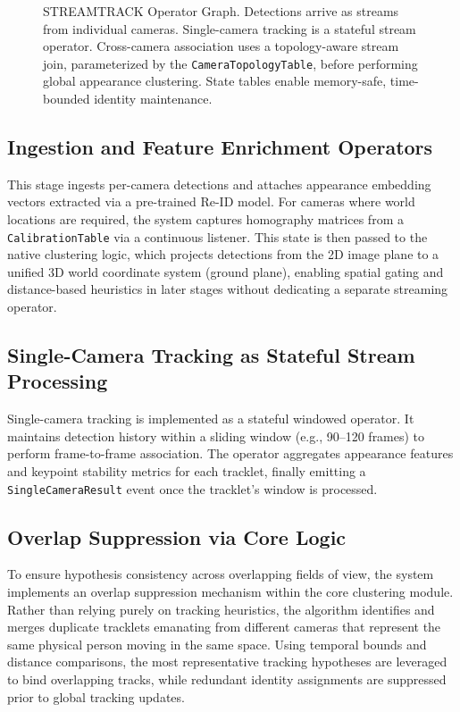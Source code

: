\documentclass[11pt]{article}
\begin{document}
\begin{figure}[H]
{
}
\caption{STREAMTRACK Operator Graph. Detections arrive as streams from individual cameras. Single-camera tracking is a stateful stream operator. Cross-camera association uses a topology-aware stream join, parameterized by the \texttt{CameraTopologyTable}, before performing global appearance clustering. State tables enable memory-safe, time-bounded identity maintenance.}
\label{fig:architecture}
\end{figure}

\subsection{Ingestion and Feature Enrichment Operators}
This stage ingests per-camera detections and attaches appearance embedding vectors extracted via a pre-trained Re-ID model. For cameras where world locations are required, the system captures homography matrices from a \texttt{CalibrationTable} via a continuous listener. This state is then passed to the native clustering logic, which projects detections from the 2D image plane to a unified 3D world coordinate system (ground plane), enabling spatial gating and distance-based heuristics in later stages without dedicating a separate streaming operator.

\subsection{Single-Camera Tracking as Stateful Stream Processing}
Single-camera tracking is implemented as a stateful windowed operator. It maintains detection history within a sliding window (e.g., 90--120 frames) to perform frame-to-frame association. The operator aggregates appearance features and keypoint stability metrics for each tracklet, finally emitting a \texttt{SingleCameraResult} event once the tracklet's window is processed.

\subsection{Overlap Suppression via Core Logic}
To ensure hypothesis consistency across overlapping fields of view, the system implements an overlap suppression mechanism within the core clustering module. Rather than relying purely on tracking heuristics, the algorithm identifies and merges duplicate tracklets emanating from different cameras that represent the same physical person moving in the same space. Using temporal bounds and distance comparisons, the most representative tracking hypotheses are leveraged to bind overlapping tracks, while redundant identity assignments are suppressed prior to global tracking updates.
\end{document}
